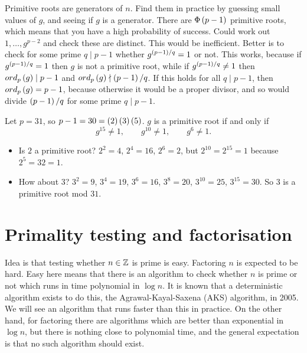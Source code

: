 
Primitive roots are generators of $ \unit{n} $. Find them in practice by guessing small values of $ g $, and seeing if $ g $ is a generator. There are $ \Phi\left( p - 1 \right) $ primitive roots, which means that you have a high probability of success. Could work out $ 1, \dots, g^{p - 2} $ and check these are distinct. This would be inefficient. Better is to check for some prime $ q \mid p - 1 $ whether $ g^{\left( p - 1 \right) / q} = 1 $ or not. This works, because if $ g^{\left( p - 1 \right) / q} = 1 $ then $ g $ is not a primitive root, while if $ g^{\left( p - 1 \right) / q} \ne 1 $ then $ ord_p\left( g \right) \mid p - 1 $ and $ ord_p\left( g \right) \nmid \left( p - 1 \right) / q $. If this holds for all $ q \mid p - 1 $, then $ ord_p\left( g \right) = p - 1 $, because otherwise it would be a proper divisor, and so would divide $ \left( p - 1 \right) / q $ for some prime $ q \mid p - 1 $.

\begin{example2}
Let $ p = 31 $, so $ p - 1 = 30 = \left( 2 \right)\left( 3 \right)\left( 5 \right) $. $ g $ is a primitive root if and only if
$$ g^{15} \ne 1, \qquad g^{10} \ne 1, \qquad g^{6} \ne 1. $$
\begin{itemize}
\item Is $ 2 $ a primitive root? $ 2^2 = 4 $, $ 2^4 = 16 $, $ 2^6 = 2 $, but $ 2^{10} = 2^{15} = 1 $ because $ 2^5 = 32 = 1 $.
\item How about $ 3 $? $ 3^2 = 9 $, $ 3^4 = 19 $, $ 3^6 = 16 $, $ 3^8 = 20 $, $ 3^{10} = 25 $, $ 3^{15} = 30 $. So $ 3 $ is a primitive root mod $ 31 $.
\end{itemize}
\end{example2}

\pagebreak

\section{Primality testing and factorisation}

Idea is that testing whether $ n \in \mathbb{Z} $ is prime is easy. Factoring $ n $ is expected to be hard. Easy here means that there is an algorithm to check whether $ n $ is prime or not which runs in time polynomial in $ \log n $. It is known that a deterministic algorithm exists to do this, the Agrawal-Kayal-Saxena (AKS) algorithm, in 2005. We will see an algorithm that runs faster than this in practice. On the other hand, for factoring there are algorithms which are better than exponential in $ \log n $, but there is nothing close to polynomial time, and the general expectation is that no such algorithm should exist.

